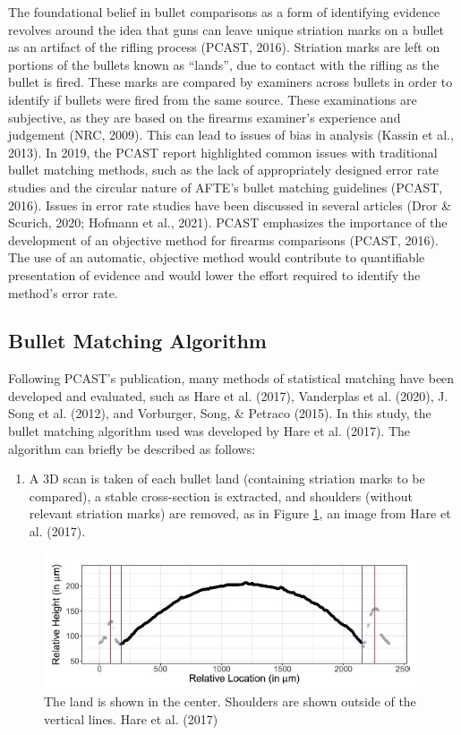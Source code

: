 \documentclass[print]{nuthesis}
\providecommand{\tightlist}{%
  \setlength{\itemsep}{0pt}\setlength{\parskip}{0pt}}
\begin{document}
The foundational belief in bullet comparisons as a form of identifying evidence revolves around the idea that guns can leave unique striation marks on a bullet as an artifact of the rifling process (PCAST, 2016).
Striation marks are left on portions of the bullets known as ``lands'', due to contact with the rifling as the bullet is fired.
These marks are compared by examiners across bullets in order to identify if bullets were fired from the same source.
These examinations are subjective, as they are based on the firearms examiner's experience and judgement (NRC, 2009).
This can lead to issues of bias in analysis (Kassin et al., 2013). In 2019, the PCAST report highlighted common issues with traditional bullet matching methods, such as the lack of appropriately designed error rate studies and the circular nature of AFTE's bullet matching guidelines (PCAST, 2016).
Issues in error rate studies have been discussed in several articles (Dror \& Scurich, 2020; Hofmann et al., 2021).
PCAST emphasizes the importance of the development of an objective method for firearms comparisons (PCAST, 2016).
The use of an automatic, objective method would contribute to quantifiable presentation of evidence and would lower the effort required to identify the method's error rate.

\hypertarget{bullet-matching-algorithm-1}{%
\subsection{Bullet Matching Algorithm}\label{bullet-matching-algorithm-1}}

Following PCAST's publication, many methods of statistical matching have been developed and evaluated, such as Hare et al. (2017), Vanderplas et al. (2020), J. Song et al. (2012), and Vorburger, Song, \& Petraco (2015).
In this study, the bullet matching algorithm used was developed by Hare et al. (2017).
The algorithm can briefly be described as follows:

\begin{enumerate}
\def\labelenumi{\arabic{enumi}.}
\tightlist
\item
  A 3D scan is taken of each bullet land (containing striation marks to be compared), a stable cross-section is extracted, and shoulders (without relevant striation marks) are removed, as in Figure \ref{fig:shoulder}, an image from Hare et al. (2017).
\end{enumerate}

\begin{figure}
\includegraphics[width=\linewidth]{images/shoulder} \caption[The land is shown in the center]{The land is shown in the center. Shoulders are shown outside of the vertical lines. Hare et al. (2017)}\label{fig:shoulder}
\end{figure}
\end{document}
